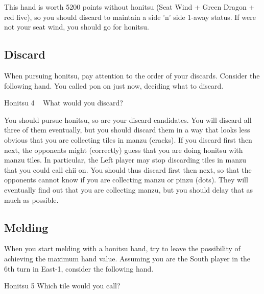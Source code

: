\bigskip
\noindent This hand is worth 5200 points without {\jap honitsu} (Seat Wind + Green Dragon + red five), so you should discard {\LARGE{}} to maintain a side 'n' side 1-away status. If {\LARGE\nan} were not your seat wind, you should go for {\jap honitsu}.

\newpage
\subsection{Discard}
When pursuing {\jap honitsu}, pay attention to the order of your discards.
Consider the following hand. You called {\jap pon} on {\LARGE\bai} just now, deciding what to discard.
\begin{itembox}[r]{{\jap Honitsu} 4}
\bp
{}\bei\bei\zhong~\bai\bai\rbai
\ep
\vspace{-10pt}What would you discard? \vspace{-5pt}
\end{itembox}

\bigskip
\noindent You should pursue {\jap honitsu}, so {\LARGE{}} are your discard candidates. You will discard all three of them eventually, but you should discard them in a way that looks less obvious that you are collecting tiles in {\jap manzu} (cracks).
If you discard {\LARGE{}} first then {\LARGE{}} next, the opponents might (correctly) guess that you are doing {\jap honitsu} with {\jap manzu} tiles.
In particular, the Left player may stop discarding tiles in {\jap manzu} that you could call {\jap chii} on. You should thus discard {\LARGE{}} first then {\LARGE{}} next, so that the opponents cannot know if you are collecting {\jap manzu} or {\jap pinzu} (dots). They will eventually find out that you are collecting {\jap manzu}, but you should delay that as much as possible.

\newpage
\subsection{Melding}
When you start melding with a {\jap honitsu} hand, try to leave the possibility of achieving the maximum hand value. Assuming you are the South player in the 6th turn in East-1, consider the following hand.

\begin{itembox}[r]{{\jap Honitsu} 5}
\bp
{}\xi\bei\bei\fa\fa
\ep
\vspace{-10pt}Which tile would you call? \vspace{-5pt}
\end{itembox}

